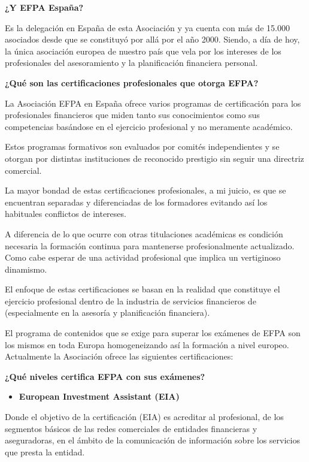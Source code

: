 \documentclass[
  letterpaper,
  DIV=11,
  numbers=noendperiod]{scrreprt}
\begin{document}
\textbf{¿Y EFPA España?}

Es la delegación en España de esta Asociación y ya cuenta con más de
15.000 asociados desde que se constituyó por allá por el año 2000.
Siendo, a día de hoy, la única asociación europea de nuestro país que
vela por los intereses de los profesionales del asesoramiento y la
planificación financiera personal.

\textbf{¿Qué son las certificaciones profesionales que otorga EFPA?}

La Asociación EFPA en España ofrece varios programas de certificación
para los profesionales financieros que miden tanto sus conocimientos
como sus competencias basándose en el ejercicio profesional y no
meramente académico.

Estos programas formativos son evaluados por comités independientes y se
otorgan por distintas instituciones de reconocido prestigio sin seguir
una directriz comercial.

La mayor bondad de estas certificaciones profesionales, a mi juicio, es
que se encuentran separadas y diferenciadas de los formadores evitando
así los habituales conflictos de intereses.

A diferencia de lo que ocurre con otras titulaciones académicas es
condición necesaria la formación continua para mantenerse
profesionalmente actualizado. Como cabe esperar de una actividad
profesional que implica un vertiginoso dinamismo.

El enfoque de estas certificaciones se basan en la realidad que
constituye el ejercicio profesional dentro de la industria de servicios
financieros de (especialmente en la asesoría y planificación
financiera).

El programa de contenidos que se exige para superar los exámenes de EFPA
son los mismos en toda Europa homogeneizando así la formación a nivel
europeo. Actualmente la Asociación ofrece las siguientes
certificaciones:

\textbf{¿Qué niveles certifica EFPA con sus exámenes?}

\begin{itemize}
\item
  \textbf{European Investment Assistant (EIA)}
\end{itemize}

Donde el objetivo de la certificación (EIA) es acreditar al profesional,
de los segmentos básicos de las redes comerciales de entidades
financieras y aseguradoras, en el ámbito de la comunicación de
información sobre los servicios que presta la entidad.
\end{document}

